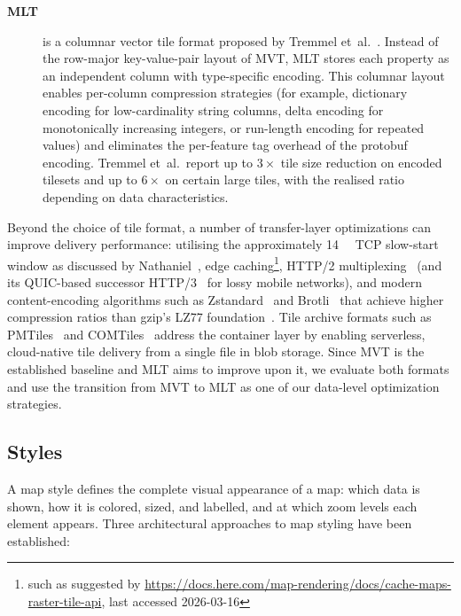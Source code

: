 \begin{description}
    \item[\textbf{\acf{MLT}}] \begin{sloppypar} is a columnar vector tile format proposed by Tremmel et~al.~\cite{tremmelMapLibreTileNext2025b}.
    Instead of the row-major key-value-pair layout of \ac{MVT}, \ac{MLT} stores each property as an independent column with type-specific encoding.
    This columnar layout enables per-column compression strategies (for example, dictionary encoding for low-cardinality string columns, delta encoding for monotonically increasing integers, or run-length encoding for repeated values) and eliminates the per-feature tag overhead of the protobuf encoding.
    Tremmel et~al.\ report up to $3\times$ tile size reduction on encoded tilesets and up to $6\times$ on certain large tiles, with the realised ratio depending on data characteristics.\end{sloppypar}
\end{description}

Beyond the choice of tile format, a number of transfer-layer optimizations can improve delivery performance:
utilising the approximately \qty{14}{\kilo\byte} TCP slow-start window as discussed by Nathaniel~\cite{WhyYourWebsite}, edge caching\footnote{such as suggested by \url{https://docs.here.com/map-rendering/docs/cache-maps-raster-tile-api}, last accessed 2026-03-16}, HTTP/2 multiplexing~\cite{belsheHypertextTransferProtocol2015} (and its QUIC-based successor HTTP/3~\cite{bishopHTTP32022} for lossy mobile networks), and modern content-encoding algorithms such as Zstandard~\cite{colletZstandardCompressionApplication2021} and Brotli~\cite{alakuijalaBrotliCompressedData2016} that achieve higher compression ratios than gzip's LZ77 foundation~\cite{zivUniversalAlgorithmSequential1977}.
Tile archive formats such as PMTiles~\cite{PMTilesConceptsProtomaps} and COMTiles~\cite{tremmelCOMTILESCASESTUDY2023} address the container layer by enabling serverless, cloud-native tile delivery from a single file in blob storage.
Since \ac{MVT} is the established baseline and \ac{MLT} aims to improve upon it, we evaluate both formats and use the transition from \ac{MVT} to \ac{MLT} as one of our data-level optimization strategies.

\subsection{Styles}\label{sec:styles}

A map style defines the complete visual appearance of a map: which data is shown, how it is colored, sized, and labelled, and at which zoom levels each element appears.
Three architectural approaches to map styling have been established:

